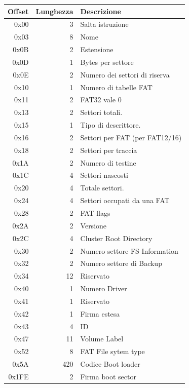 \begin{itemize}
		      \begin{center}
		      \begin{tabular}{|r|r|l|}\hline
			  \textbf {Offset} & \textbf{Lunghezza} & \textbf{Descrizione}\\\hline
			  0x00 & 3 & Salta istruzione\\\hline
			  0x03 & 8 & Nome	\\\hline
			  0x0B & 2 & Estensione\\\hline
			  0x0D & 1 & Bytes per settore \\\hline
			  0x0E & 2 & Numero dei settori di riserva\\\hline
			  0x10 & 1 & Numero di tabelle FAT \\\hline
			  0x11 & 2 & FAT32 vale 0 \\\hline
			  0x13 & 2 & Settori totali. \\\hline
			  0x15 & 1 & Tipo di descrittore. \\\hline
			  0x16 & 2 & Settori per FAT (per FAT12/16) \\\hline
			  0x18 & 2 & Settori per traccia \\\hline
			  0x1A & 2 & Numero di testine \\\hline
			  0x1C & 4 & Settori nascosti \\\hline
			  0x20 & 4 & Totale settori. \\\hline
			  0x24 & 4 & Settori occupati da una FAT \\\hline
			  0x28 & 2 & FAT flags \\\hline
			  0x2A & 2 & Versione \\\hline
			  0x2C & 4 & Cluster Root Directory \\\hline
			  0x30 & 2 & Numero settore FS Information \\\hline
			  0x32 & 2 & Numero settore di Backup \\\hline
			  0x34 & 12 & Riservato \\\hline
			  0x40 & 1 & Numero Driver \\\hline
			  0x41 & 1 & Riservato \\\hline
			  0x42 & 1 & Firma estesa \\\hline
			  0x43 & 4 & ID \\\hline
			  0x47 & 11 & Volume Label \\\hline
			  0x52 & 8 & FAT File sytem type\\\hline
			  0x5A & 420 & Codice Boot loader\\\hline
			  0x1FE & 2 & Firma boot sector\\\hline
		      \end{tabular}
		      \end{center}



	     \end{itemize}
     
